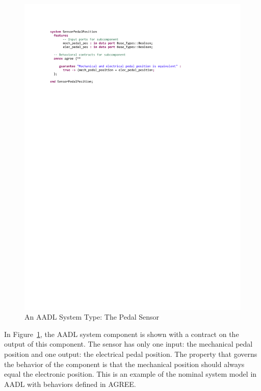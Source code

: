 \begin{figure}[h!]
	\hspace*{-2cm}
	\vspace{-0.4in} 
	\begin{center}
		\includegraphics[trim=0 640 -10 70,clip,width=1.5\dimexpr\textwidth-2cm\relax]{images/system_sensor.pdf}
		\caption{An AADL System Type: The Pedal Sensor}
		\label{fig:sensor}
	\end{center}
	\vspace{-0.3in}
\end{figure}

In Figure~\ref{fig:sensor}, the AADL system component is shown with a contract on the output of this component. The sensor has only one input: the mechanical pedal position and one output: the electrical pedal position. The property that governs the behavior of the component is that the mechanical position should always equal the electronic position. This is an example of the nominal system model in AADL with behaviors defined in AGREE. 

